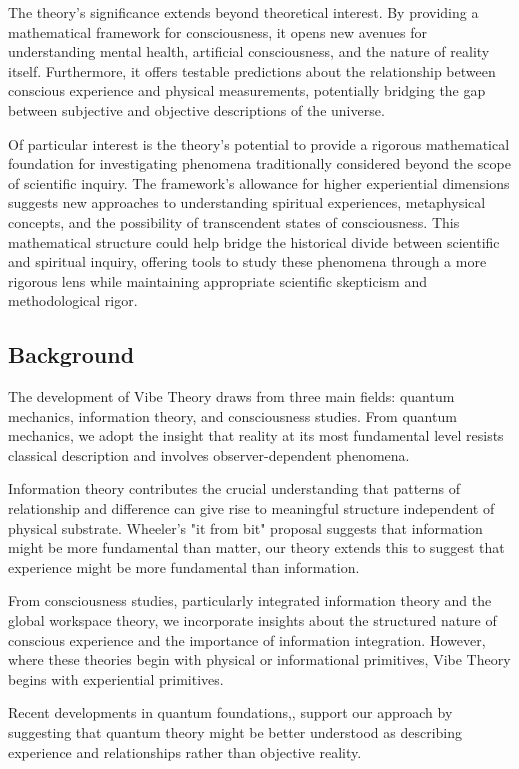 \documentclass{article}
\theoremstyle{definition}
\theoremstyle{axiom}
\theoremstyle{theorem}
\theoremstyle{proposition}
\begin{document}
The theory's significance extends beyond theoretical interest. By providing a mathematical framework for consciousness, it opens new avenues for understanding mental health, artificial consciousness, and the nature of reality itself. Furthermore, it offers testable predictions about the relationship between conscious experience and physical measurements, potentially bridging the gap between subjective and objective descriptions of the universe.

Of particular interest is the theory's potential to provide a rigorous mathematical foundation for investigating phenomena traditionally considered beyond the scope of scientific inquiry. The framework's allowance for higher experiential dimensions suggests new approaches to understanding spiritual experiences, metaphysical concepts, and the possibility of transcendent states of consciousness. This mathematical structure could help bridge the historical divide between scientific and spiritual inquiry, offering tools to study these phenomena through a more rigorous lens while maintaining appropriate scientific skepticism and methodological rigor.

\subsection{Background}

The development of Vibe Theory draws from three main fields: quantum mechanics, information theory, and consciousness studies. From quantum mechanics, we adopt the insight that reality at its most fundamental level resists classical description and involves observer-dependent phenomena.

Information theory contributes the crucial understanding that patterns of relationship and difference can give rise to meaningful structure independent of physical substrate. Wheeler's "it from bit" proposal suggests that information might be more fundamental than matter, our theory extends this to suggest that experience might be more fundamental than information.

From consciousness studies, particularly integrated information theory and the global workspace theory, we incorporate insights about the structured nature of conscious experience and the importance of information integration. However, where these theories begin with physical or informational primitives, Vibe Theory begins with experiential primitives.

Recent developments in quantum foundations,, support our approach by suggesting that quantum theory might be better understood as describing experience and relationships rather than objective reality.
\end{document}
